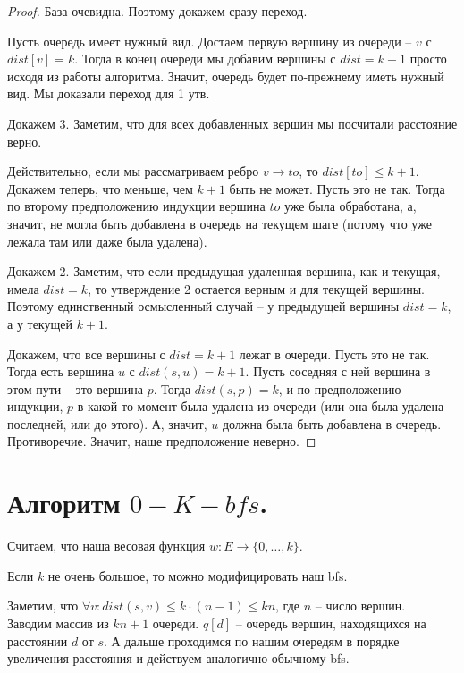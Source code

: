 \begin{proof}
База очевидна.
Поэтому докажем сразу переход.

Пусть очередь имеет нужный вид. Достаем первую вершину из очереди -- $v$ с $dist[v] = k$. Тогда в конец очереди мы добавим вершины с $dist = k + 1$ просто исходя из работы алгоритма. Значит, очередь будет по-прежнему иметь нужный вид. Мы доказали переход для 1 утв.

Докажем 3.
Заметим, что для всех добавленных вершин мы посчитали расстояние верно.

Действительно, если мы рассматриваем ребро $v \to to$, то $dist[to] \leq k + 1$. Докажем теперь, что меньше, чем $k + 1$ быть не может. Пусть это не так. Тогда по второму предположению индукции вершина $to$ уже была обработана, а, значит, не могла быть добавлена в очередь на текущем шаге (потому что уже лежала там или даже была удалена).

Докажем 2.
Заметим, что если предыдущая удаленная вершина, как и текущая, имела $dist = k$, то утверждение 2 остается верным и для текущей вершины. Поэтому единственный осмысленный случай -- у предыдущей вершины $dist = k$, а у текущей $k + 1$. 

Докажем, что все вершины с $dist = k + 1$ лежат в очереди. Пусть это не так. Тогда есть вершина $u$ с $dist(s, u) = k + 1$. Пусть соседняя с ней вершина в этом пути -- это вершина $p$. Тогда $dist(s, p) = k$, и по предположению индукции, $p$ в какой-то момент была удалена из очереди (или она была удалена последней, или до этого). А, значит, $u$ должна была быть добавлена в очередь. Противоречие. Значит, наше предположение неверно.
\end{proof}

\setcounter{section}{45}
\section{Алгоритм $0-K-bfs$.}

Считаем, что наша весовая функция $w : E \to \{0, \dotsc, k\}$.

Если $k$ не очень большое, то можно модифицировать наш bfs.

Заметим, что $\forall v : dist(s, v) \leq k \cdot (n - 1) \leq kn$, где $n$ -- число вершин.\\

Заводим массив из $kn + 1$ очереди. $q[d]$ --  очередь вершин, находящихся на расстоянии $d$ от $s$. А дальше проходимся по нашим очередям в порядке увеличения расстояния и действуем аналогично обычному bfs.


